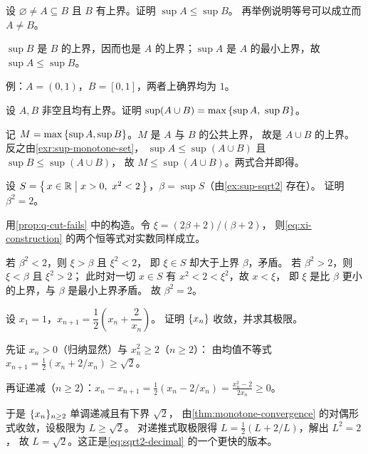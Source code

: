 \begin{exercise}[例行]
  \label{exr:sup-monotone-set}
  设 \(\varnothing \neq A \subseteq B\) 且 \(B\) 有上界。证明 \(\sup A \le \sup B\)。
  再举例说明等号可以成立而 \(A \neq B\)。
  \begin{solution}
    \(\sup B\) 是 \(B\) 的上界，因而也是 \(A\) 的上界；\(\sup A\) 是 \(A\)
    的最小上界，故 \(\sup A \le \sup B\)。

    例：\(A = (0,1)\)，\(B = [0,1]\)，两者上确界均为 \(1\)。
  \end{solution}
\end{exercise}

\begin{exercise}[例行]
  \label{exr:sup-union}
  设 \(A, B\) 非空且均有上界。证明 \(\sup(A \cup B) = \max\left\{\sup A,\ \sup B\right\}\)。
  \begin{solution}
    记 \(M = \max\left\{\sup A, \sup B\right\}\)。\(M\) 是 \(A\) 与 \(B\) 的公共上界，
    故是 \(A \cup B\) 的上界。反之由\cref{exr:sup-monotone-set}，
    \(\sup A \le \sup(A\cup B)\) 且 \(\sup B \le \sup(A \cup B)\)，
    故 \(M \le \sup(A \cup B)\)。两式合并即得。
  \end{solution}
\end{exercise}

\begin{exercise}[例行]
  \label{exr:sup-sqrt2-value}
  设 \(S = \left\{\,x \in \mathbb{R} \;\middle|\; x > 0,\ x^{2} < 2\,\right\}\)，\(\beta = \sup S\)（由\cref{ex:sup-sqrt2} 存在）。
  证明 \(\beta^{2} = 2\)。
  \begin{solution}
    用\cref{prop:q-cut-fails} 中的构造。令 \(\xi = (2\beta+2)/(\beta+2)\)，
    则\cref{eq:xi-construction} 的两个恒等式对实数同样成立。

    若 \(\beta^{2} < 2\)，则 \(\xi > \beta\) 且 \(\xi^{2} < 2\)，
    即 \(\xi \in S\) 却大于上界 \(\beta\)，矛盾。
    若 \(\beta^{2} > 2\)，则 \(\xi < \beta\) 且 \(\xi^{2} > 2\)；
    此时对一切 \(x \in S\) 有 \(x^{2} < 2 < \xi^{2}\)，故 \(x < \xi\)，
    即 \(\xi\) 是比 \(\beta\) 更小的上界，与 \(\beta\) 是最小上界矛盾。
    故 \(\beta^{2} = 2\)。
  \end{solution}
\end{exercise}

\begin{exercise}[例行]
  \label{exr:monotone-apply}
  设 \(x_{1} = 1\)，\(x_{n+1} = \dfrac{1}{2}\left(x_{n} + \dfrac{2}{x_{n}}\right)\)。
  证明 \(\{x_{n}\}\) 收敛，并求其极限。
  \begin{solution}
    先证 \(x_{n} > 0\)（归纳显然）与 \(x_{n}^{2} \ge 2\)（\(n \ge 2\)）：
    由均值不等式 \(x_{n+1} = \frac{1}{2}(x_{n} + 2/x_{n}) \ge \sqrt{2}\)。

    再证递减（\(n \ge 2\)）：\(x_{n} - x_{n+1} = \frac{1}{2}(x_{n} - 2/x_{n})
    = \frac{x_{n}^{2}-2}{2x_{n}} \ge 0\)。

    于是 \(\{x_{n}\}_{n \ge 2}\) 单调递减且有下界 \(\sqrt{2}\)，
    由\cref{thm:monotone-convergence} 的对偶形式收敛，设极限为 \(L \ge \sqrt2\)。
    对递推式取极限得 \(L = \frac{1}{2}(L + 2/L)\)，解出 \(L^{2} = 2\)，
    故 \(L = \sqrt{2}\)。这正是\cref{eq:sqrt2-decimal} 的一个更快的版本。
  \end{solution}
\end{exercise}

